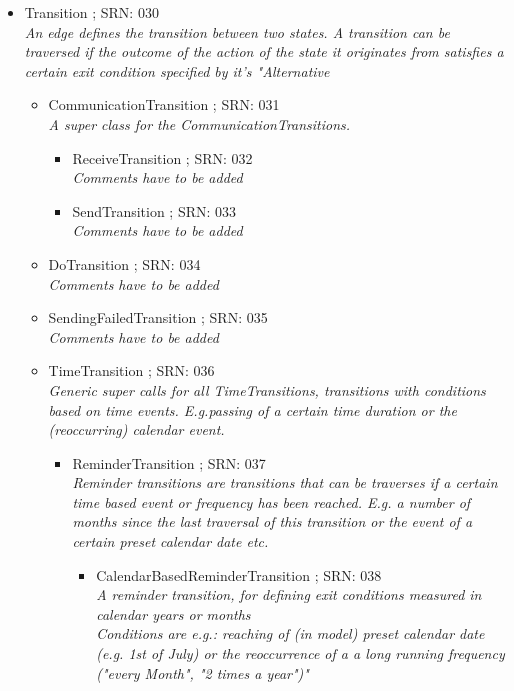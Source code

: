 \begin{itemize}
\begin{itemize}
\begin{itemize}
\begin{itemize}
		\end{itemize}
		\item Transition ; SRN: 030 \\ \textit{An edge defines the transition between two states. A transition can be traversed if the outcome of the action of the state it originates from satisfies a certain exit condition specified by it's "Alternative}
		\begin{itemize}
			\item CommunicationTransition ; SRN: 031 \\ \textit{A super class for the CommunicationTransitions.}
			\begin{itemize}
				\item ReceiveTransition ; SRN: 032 \\ \textit{Comments have to be added}
				\item SendTransition ; SRN: 033 \\ \textit{Comments have to be added}
			\end{itemize}
			\item DoTransition ; SRN: 034 \\ \textit{Comments have to be added}
			\item SendingFailedTransition ; SRN: 035 \\ \textit{Comments have to be added}
			\item TimeTransition ; SRN: 036 \\ \textit{Generic super calls for all TimeTransitions, transitions with conditions based on time events. E.g.passing of a certain time duration or the (reoccurring) calendar event. }
			\begin{itemize}
				\item ReminderTransition ; SRN: 037 \\ \textit{Reminder transitions are transitions that can be traverses if a certain time based event or frequency has been reached. E.g. a number of months since the last traversal of this transition or the event of a certain preset calendar date etc.}
				\begin{itemize}
					\item CalendarBasedReminderTransition ; SRN: 038 \\ \textit{A reminder transition, for defining exit conditions measured in calendar years or months \\ Conditions are e.g.: reaching of (in model) preset calendar date (e.g. 1st of July) or the reoccurrence of a a long running frequency ("every Month", "2 times a year")"}

\end{itemize}
\end{itemize}
\end{itemize}
\end{itemize}
\end{itemize}
\end{itemize}
